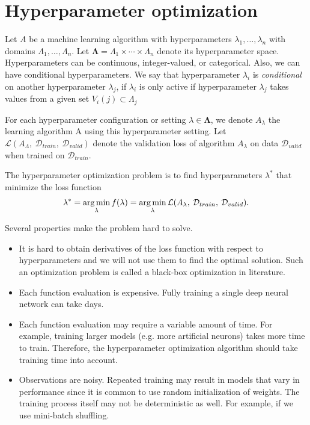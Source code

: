\section{Hyperparameter optimization}

Let $A$ be a machine learning algorithm with hyperparameters $\lambda_1, \dots , \lambda_n$ with domains $\Lambda_1,\dots , \Lambda_n$. Let $ \mathbf{\Lambda } = \Lambda_1 \times \cdots \times \Lambda_n$ denote its hyperparameter space. Hyperparameters can be continuous, integer-valued, or categorical. Also, we can have conditional hyperparameters. We say that hyperparameter $\lambda_i$ is \emph{conditional} on another hyperparameter $\lambda_j$, if $\lambda_i$ is only active if hyperparameter $\lambda_j$ takes values from a given set $V_i(j) \subset \Lambda_j$

For each hyperparameter configuration or setting $\lambda \in \mathbf{\Lambda}$, we denote $A_\lambda$ the learning algorithm A using this hyperparameter setting. Let $\mathcal{L}(A_\Lambda, \: \mathcal{D}_{train}, \: \mathcal{D}_{valid})$ denote the validation loss of algorithm $A_\lambda$ on data $\mathcal{D}_{valid}$ when trained on $\mathcal{D}_{train}$.

\begin{defn}\label{defn:x}
The hyperparameter optimization problem is to find hyperparameters $\lambda^*$ that minimize the loss function  \[\lambda^*=\operatorname*{arg\,min} _\lambda f(\lambda)=\operatorname*{arg\,min}_\lambda \mathcal{L}(A_\lambda, \: \mathcal{D}_{train}, \:  \mathcal{D}_{valid}).\]
\end{defn}

Several properties make the problem hard to solve.
\begin{itemize}
    \item It is hard to obtain derivatives of the loss function with respect to hyperparameters and we will not use them to find the optimal solution. Such an optimization problem is called a black-box optimization in literature.
    \item Each function evaluation is expensive. Fully training a single deep neural network can take days.
    \item Each function evaluation may require a variable amount of time. For example, training larger models (e.g. more artificial neurons) takes more time to train. Therefore, the hyperparameter optimization algorithm should take training time into account.
    \item Observations are noisy. Repeated training may result in models that vary in performance since it is common to use random initialization of weights. The training process itself may not be deterministic as well. For example, if we use mini-batch shuffling.
\end{itemize}

